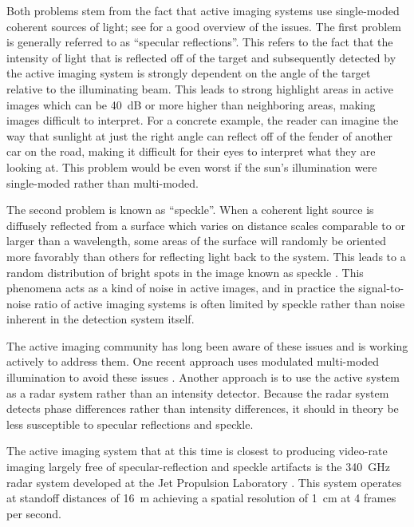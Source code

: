 Both problems stem from the fact that active imaging systems use single-moded coherent sources of light; see \cite{petkie_active_2008} for a good overview of the issues.
The first problem is generally referred to as ``specular reflections''.
This refers to the fact that the intensity of light that is reflected off of the target and subsequently detected by the active imaging system is strongly dependent on the angle of the target relative to the illuminating beam.
This leads to strong highlight areas in active images which can be \SI{40}{\dB} or more higher than neighboring areas, making images difficult to interpret.
For a concrete example, the reader can imagine the way that sunlight at just the right angle can reflect off of the fender of another car on the road, making it difficult for their eyes to interpret what they are looking at.
This problem would be even worst if the sun's illumination were single-moded rather than multi-moded.

The second problem is known as ``speckle''.
When a coherent light source is diffusely reflected from a surface which varies on distance scales comparable to or larger than a wavelength, some areas of the surface will randomly be oriented more favorably than others for reflecting light back to the system.
This leads to a random distribution of bright spots in the image known as speckle \cite{goodman_fundamental_1976}.
This phenomena acts as a kind of noise in active images, and in practice the signal-to-noise ratio of active imaging systems is often limited by speckle rather than noise inherent in the detection system itself.

The active imaging community has long been aware of these issues and is working actively to address them.
One recent approach uses modulated multi-moded illumination to avoid these issues \cite{petkie_multimode_2012,patrick_elimination_2012}.
Another approach is to use the active system as a radar system rather than an intensity detector.
Because the radar system detects phase differences rather than intensity differences, it should in theory be less susceptible to specular reflections and speckle. %

The active imaging system that at this time is closest to producing video-rate imaging largely free of specular-reflection and speckle artifacts is the \SI{340}{\GHz} radar system developed at the Jet Propulsion Laboratory \cite{cooper_thz_2011}.
This system operates at standoff distances of \SI{16}{\m} achieving a spatial resolution of \SI{1}{\cm} at 4 frames per second.


